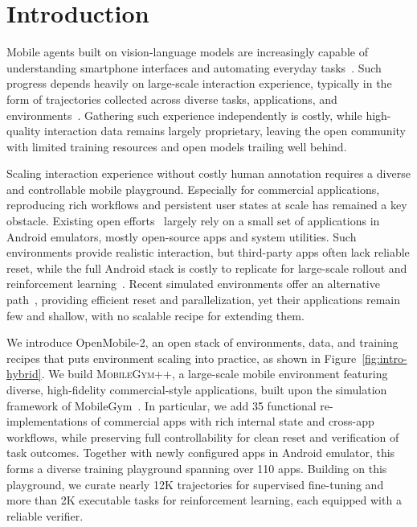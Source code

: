 
\section{Introduction}
\label{sec:intro}


Mobile agents built on vision-language models are increasingly capable of understanding smartphone interfaces and automating everyday tasks~\citep{wang2025ui, zhou2025mai, xu2026mobile, gao2026ui, zhou2026qwen}.
Such progress depends heavily on large-scale interaction experience, typically in the form of trajectories collected across diverse tasks, applications, and environments~\citep{cheng2026openmobile, team2026ui}. 
Gathering such experience independently is costly, while high-quality interaction data remains largely proprietary, leaving the open community with limited training resources and open models trailing well behind.


Scaling interaction experience without costly human annotation requires a diverse and controllable mobile playground. 
Especially for commercial applications, reproducing rich workflows and persistent user states at scale has remained a key obstacle.
Existing open efforts~\citep{sun2025genesis,cheng2026openmobile} largely rely on a small set of applications in Android emulators, mostly open-source apps and system utilities. Such environments provide realistic interaction, but third-party apps often lack reliable reset, while the full Android stack is costly to replicate for large-scale rollout and reinforcement learning~\citep{rawles2025androidworld}. Recent simulated environments offer an alternative path~\citep{wu2026mobilegym, liu2026phoneworld}, providing efficient reset and parallelization, yet their applications remain few and shallow, with no scalable recipe for extending them.

We introduce OpenMobile-2, an open stack of environments, data, and training recipes that puts environment scaling into practice, as shown in Figure~\ref{fig:intro-hybrid}.
We build \textsc{MobileGym++}, a large-scale mobile environment featuring diverse, high-fidelity commercial-style applications, built upon the simulation framework of MobileGym~\citep{wu2026mobilegym}.
In particular, we add 35 functional re-implementations of commercial apps with rich internal state and cross-app workflows, while preserving full controllability for clean reset and verification of task outcomes.
Together with newly configured apps in Android emulator, this forms a diverse training playground spanning over 110 apps. Building on this playground, we curate nearly 12K trajectories for supervised fine-tuning and more than 2K executable tasks for reinforcement learning, each equipped with a reliable verifier.



